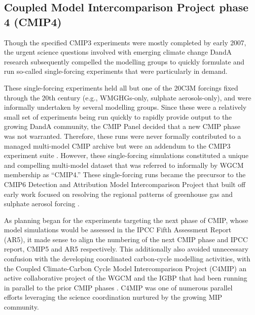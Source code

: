 \documentclass[manuscript]{copernicus}
\begin{document}
\subsection{Coupled Model Intercomparison Project phase 4 (CMIP4)}

Though the specified CMIP3 experiments were mostly completed by early 2007, the urgent science questions involved with emerging climate change DandA research subsequently compelled the modelling groups to quickly formulate and run so-called single-forcing experiments that were particularly in demand.

These single-forcing experiments held all but one of the 20C3M forcings fixed through the 20th century (e.g., WMGHGs-only, sulphate aerosols-only), and were informally undertaken by several modelling groups. Since these were a relatively small set of experiments being run quickly to rapidly provide output to the growing DandA community, the CMIP Panel decided that a new CMIP phase was not warranted. Therefore, these runs were never formally contributed to a managed multi-model CMIP archive but were an addendum to the CMIP3 experiment suite \citep{stouffer_cmip5_2017}. However, these single-forcing simulations constituted a unique and compelling multi-model dataset that was referred to informally by WGCM membership as ``CMIP4.'' These single-forcing runs became the precursor to the CMIP6 Detection and Attribution Model Intercomparison Project \citep[DAMIP;][]{gillett_detection_2016} that built off early work focused on resolving the regional patterns of greenhouse gas and sulphate aerosol forcing \citep{taylor_response_1994, santer_towards_1995, hegerl_optimal_2000, gillett_detecting_2002, hegerl_20c3m_2003}.

As planning began for the experiments targeting the next phase of CMIP, whose model simulations would be assessed in the IPCC Fifth Assessment Report (AR5), it made sense to align the numbering of the next CMIP phase and IPCC report, CMIP5 and AR5 respectively. This additionally also avoided unnecessary confusion with the developing coordinated carbon-cycle modelling activities, with the Coupled Climate-Carbon Cycle Model Intercomparison Project (C4MIP) an active collaborative project of the WGCM and the IGBP that had been running in parallel to the prior CMIP phases \citep[e.g.,][]{fung_full-form_2000, cox_modelling_2002, friedlingstein_climatecarbon_2006}. C4MIP was one of numerous parallel efforts leveraging the science coordination nurtured by the growing MIP community.
\end{document}
